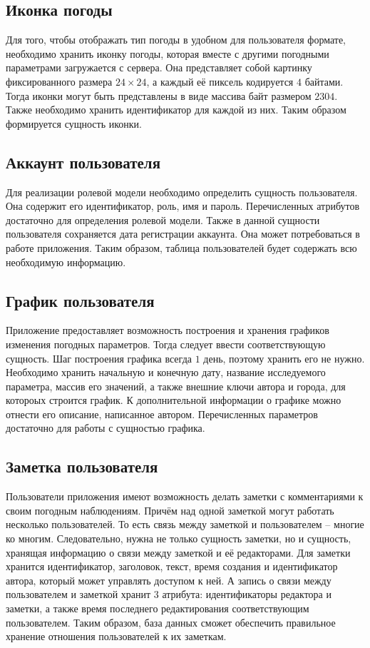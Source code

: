 \subsection*{Иконка погоды}
Для того, чтобы отображать тип погоды в удобном для пользователя формате, необходимо хранить иконку погоды, которая вместе с другими погодными параметрами загружается с сервера.
Она представляет собой картинку фиксированного размера $24\times24$, а каждый её пиксель кодируется $4$ байтами.
Тогда иконки могут быть представлены в виде массива байт размером $2304$.
Также необходимо хранить идентификатор для каждой из них.
Таким образом формируется сущность иконки.

\subsection*{Аккаунт пользователя}
Для реализации ролевой модели необходимо определить сущность пользователя.
Она содержит его идентификатор, роль, имя и пароль.
Перечисленных атрибутов достаточно для определения ролевой модели.
Также в данной сущности пользователя сохраняется дата регистрации аккаунта.
Она может потребоваться в работе приложения.
Таким образом, таблица пользователей будет содержать всю необходимую информацию.

\subsection*{График пользователя}
Приложение предоставляет возможность построения и хранения графиков изменения погодных параметров.
Тогда следует ввести соответствующую сущность.
Шаг построения графика всегда $1$ день, поэтому хранить его не нужно.
Необходимо хранить начальную и конечную дату, название исследуемого параметра, массив его значений, а также внешние ключи автора и города, для котороых строится график.
К дополнительной информации о графике можно отнести его описание, написанное автором.
Перечисленных параметров достаточно для работы с сущностью графика.

\subsection*{Заметка пользователя}
Пользователи приложения имеют возможность делать заметки с комментариями к своим погодным наблюдениям.
Причём над одной заметкой могут работать несколько пользователей.
То есть связь между заметкой и пользователем -- многие ко многим.
Следовательно, нужна не только сущность заметки, но и сущность, хранящая информацию о связи между заметкой и её редакторами.
Для заметки хранится идентификатор, заголовок, текст, время создания и идентификатор автора, который может управлять доступом к ней.
А запись о связи между пользователем и заметкой хранит $3$ атрибута: идентификаторы редактора и заметки, а также время последнего редактирования соответствующим пользователем.
Таким образом, база данных сможет обеспечить правильное хранение отношения пользователей к их заметкам.

